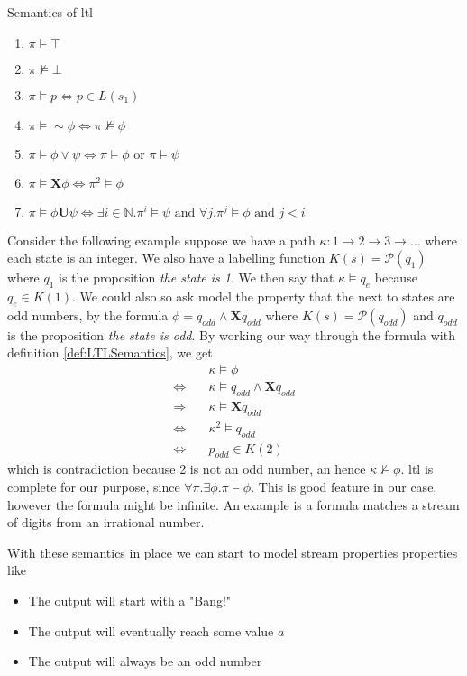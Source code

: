 \begin{definition}
\label{def:LTLSemantics}
Semantics of \acrshort{ltl}
\begin{enumerate}
    \item $\pi \vDash \top$
    \item $\pi \nvDash \bot$
    \item $\pi \vDash p \Leftrightarrow p \in L(s_1) $
    \item $\pi \vDash \sim \phi \Leftrightarrow \pi \nvDash \phi$
    \item $\pi \vDash \phi \vee \psi \Leftrightarrow \pi \vDash \phi\text{ or }\pi \vDash \psi$
    \item $\pi \vDash \mathbf{X} \phi \Leftrightarrow \pi^2 \vDash \phi$
    \item $\pi \vDash \phi \mathbf{U} \psi \Leftrightarrow \exists i\in \mathbb{N}.\pi^i \vDash \psi \text{ and } \forall j.  \pi^j \vDash \phi \text{ and } j < i$
\end{enumerate}
\end{definition}
Consider the following example suppose we have a path $\kappa: 1 \rightarrow 2 \rightarrow 3 \rightarrow \dots$   
where each state is an integer. We also have a labelling function $K(s) = \mathcal{P}({q_1})$ where $q_1$ is the proposition \emph{the state is 1}. We then say that $\kappa \vDash q_e$ because $q_e \in K(1)$.
We could also so ask model the property that the next to states are odd numbers, by the formula $\phi = q_{odd} \wedge \mathbf{X} q_{odd}$ where $K(s) = \mathcal{P}({q_{odd}})$ and $q_{odd}$ is the proposition \emph{the state is odd}.
By working our way through the formula with definition \ref{def:LTLSemantics}, we get
\begin{align*}
                            & \kappa \vDash \phi \\
    \Leftrightarrow \quad   & \kappa \vDash q_{odd} \wedge \mathbf{X} q_{odd} \\
    \Rightarrow     \quad   & \kappa \vDash \mathbf{X} q_{odd} \\ 
    \Leftrightarrow \quad   & \kappa^2 \vDash q_{odd} \\ 
    \Leftrightarrow \quad   & p_{odd} \in K(2)
\end{align*}  
which is contradiction because 2 is not an odd number, an hence $\kappa \nvDash \phi$.
\acrshort{ltl} is complete for our purpose, since $\forall \pi . \exists \phi . \pi \vDash \phi$. This is good feature in our case, however the formula might be infinite. An example is a formula matches a stream of digits from an irrational number.

With these semantics in place we can start to model stream properties properties like
\begin{itemize}
    \item The output will start with a "Bang!"
    \item The output will eventually reach some value $a$
    \item The output will always be an odd number
\end{itemize}
